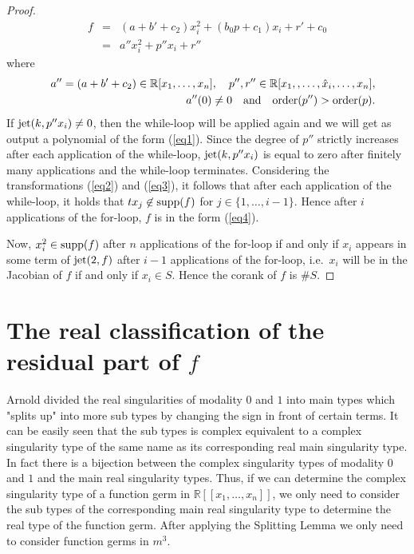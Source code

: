 \documentclass{amsproc}
\begin{document}
\begin{proof}
\begin{eqnarray}
f&=&(a+b'+c_2)x_i^2+(b_0p+c_1)x_i+r'+c_0\nonumber\\
&=&a''x_i^2+p''x_i+r''\label{eq1}
\end{eqnarray}
where
\begin{eqnarray*}
&&a'' = (a+b'+c_2)\in\mathbb R[x_1,\ldots,x_n],\quad p'',r''\in\mathbb R[x_1,,\ldots,\hat x_i,\ldots,x_n],\\ &&a''(0)\neq0\quad\textnormal{and}\quad\textnormal{order}(p'')>\textnormal{order}(p).
\end{eqnarray*}
If $\textnormal{jet}(k,p''x_i)\neq 0$, then the while-loop will be applied again
and we will get as output a polynomial of the form (\ref{eq1}). Since the degree
of $p''$ strictly increases after each application of the while-loop,
$\textnormal{jet}(k,p''x_i)$ is equal to zero after finitely many applications
and the while-loop terminates. Considering the transformations  (\ref{eq2}) and
(\ref{eq3}), it follows that after each application of the while-loop, it holds
that $tx_j\not\in\textnormal{supp}(f)$ for $j\in\{1,\ldots,i-1\}$. Hence after $i$ applications of the for-loop, $f$ is in the form (\ref{eq4}).

Now, $x_i^2\in\textnormal{supp}(f)$ after $n$ applications of the for-loop if and only if $x_i$ appears in some term of $\textnormal{jet}(2,f)$ after $i-1$ applications of the for-loop, i.e.~$x_i$ will be in the Jacobian of $f$ if and only if $x_i\in S$. Hence the corank of $f$ is $\#S$.
\end{proof}

\section{The real classification of the residual part of $f$}
Arnold divided the real singularities of modality $0$ and $1$ into main types which "splits up" into more sub types by changing the sign in front of certain terms. It can be easily seen that the sub types is complex equivalent to a complex singularity type of the same name as its corresponding real main singularity type. In fact there is a bijection between the complex singularity types of modality $0$ and $1$ and the main real singularity types. Thus, if we can determine the complex singularity type of a function germ in $\mathbb R[[x_1,\ldots,x_n]]$, we only need to consider the sub types of the corresponding main real singularity type to determine the real type of the function germ. After applying the Splitting Lemma we only need to consider function germs in $m^3$. 
\end{document}
